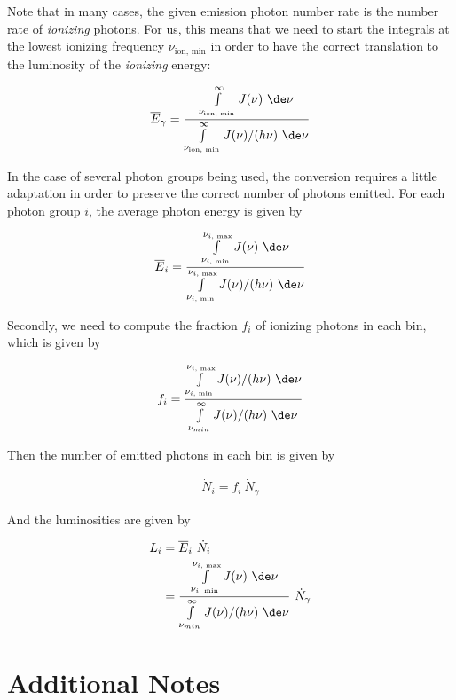 Note that in many cases, the given emission photon number rate is the number rate of \emph{ionizing} photons. For us, this means that we need to start the integrals at the lowest ionizing frequency $\nu_{\text{ion, min}}$ in order to have the correct translation to the luminosity of the \emph{ionizing} energy:


\begin{align}
	\overline{E}_\gamma = \frac{\int\limits_{\nu_{\text{ion, min}}}^\infty J(\nu) \ \de \nu }{\int\limits_{\nu_{\text{ion, min}}}^\infty J(\nu) / (h \nu) \ \de \nu}
\end{align}


In the case of several photon groups being used, the conversion requires a little adaptation in order to preserve the correct number of photons emitted. For each photon group $i$, the average photon energy is given by

\begin{align}
	\overline{E}_i = \frac{\int\limits_{\nu_{i \text{, min}}}^{\nu_{i \text{, max}}} J(\nu) \ \de \nu }{\int\limits_{\nu_{i \text{, min}}}^{\nu_{i \text{, max}}} J(\nu) / (h \nu) \ \de \nu}
\end{align}


Secondly, we need to compute the fraction $f_i$ of ionizing photons in each bin, which is given by

\begin{align}
	f_i = \frac{\int\limits_{\nu_{i \text{, min}}}^{\nu_{i \text{, max}}} J(\nu) / (h \nu)  \ \de \nu }{\int\limits_{\nu_{min}}^{\infty} J(\nu) / (h \nu) \ \de \nu}
\end{align}

Then the number of emitted photons in each bin is given by

\begin{align}
\dot{N}_i = f_i\ \dot{N}_\gamma
\end{align}

And the luminosities are given by

\begin{align}
	L_i &= \overline{E}_i \ \dot{N}_i \\
			&= \frac{\int\limits_{\nu_{i \text{, min}}}^{\nu_{i \text{, max}}} J(\nu) \ \de \nu }{\int\limits_{\nu_{min}}^{\infty} J(\nu) / (h \nu) \ \de \nu} \ \dot{N}_\gamma
\end{align}




\section{Additional Notes}

